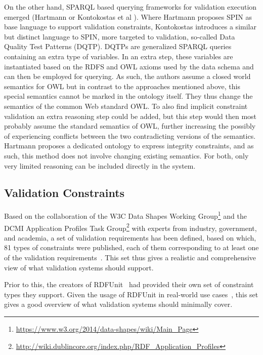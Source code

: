 On the other hand, SPARQL based querying frameworks for validation execution emerged (\eg Hartmann \cite{hartmann2016} or Kontokostas et al \cite{kontokostas2014test}).
Where Hartmann proposes SPIN as base language to support validation constraints, Kontokostas introduces a similar but distinct language to SPIN,
more targeted to validation, so-called Data Quality Test Patterns (DQTP). 
DQTPs are generalized  SPARQL queries containing an extra type of variables. In an extra step, these variables are instantiated based on the  RDFS and OWL axioms used
by the data schema and can then be employed for querying. 
As such, the authors assume a closed world semantics for OWL
but in contrast to the approaches mentioned above,
this special semantics cannot be marked in the ontology itself.
They thus change the semantics of the common Web standard OWL.
To also find implicit constraint validation an extra reasoning step could be added,
but this step would then most probably assume the standard semantics of OWL,
further increasing the possibly of experiencing conflicts between the two contradicting versions of the semantics.
Hartmann proposes a dedicated ontology
to express integrity constraints, and as such,
this method does not involve changing existing semantics.
For both, only very limited reasoning can be included directly in the system.



\subsection{\rdf Validation Constraints}\label{cons}


Based on the collaboration of
the W3C \rdf Data Shapes Working Group\footnote{\url{https://www.w3.org/2014/data-shapes/wiki/Main_Page}} and
the DCMI \rdf Application Profiles Task Group\footnote{\url{http://wiki.dublincore.org/index.php/RDF_Application_Profiles}}
with experts from industry, government, and academia,
a set of validation requirements has been defined,
based on which,
81 types of constraints were published,
each of them corresponding to at least one of the validation requirements~\cite{bosch2015rdf}.
This set thus gives a realistic and comprehensive view of what validation systems should support. 


Prior to this, the creators of RDFUnit~\cite{kontokostas2014test} had provided their own set of constraint types they support.
Given the usage of RDFUnit in real-world use cases~\cite{jurion_rdfunit},
this set gives a good overview
of what validation systems should minimally cover.


